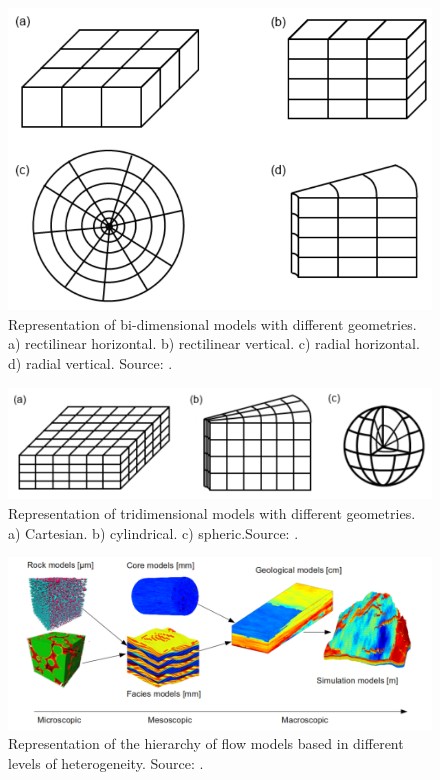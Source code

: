 \begin{figure}
	\centering
	\includegraphics[width=0.5\linewidth]{Images/9}
	\caption{Representation of bi-dimensional models with different geometries. a) rectilinear horizontal. b) rectilinear vertical. c) radial horizontal. d) radial vertical. Source: \cite{Mattax1990}.}
	\label{fig:9}
\end{figure}
\begin{figure}
	\centering
	\includegraphics[width=0.7\linewidth]{Images/10}
	\caption{Representation of tridimensional models with different geometries. a) Cartesian. b) cylindrical. c) spheric.Source: \cite{Mattax1990}.}
	\label{fig:10}
\end{figure}
\begin{figure}
	\centering
	\includegraphics[width=0.9\linewidth]{Images/13}
	\caption{Representation of the hierarchy of flow models based in different levels of heterogeneity. Source: \cite{Lie2015}.}
	\label{fig:13}
\end{figure}
